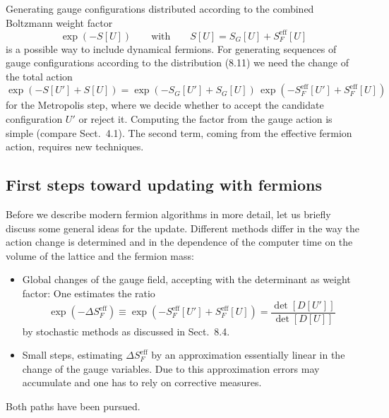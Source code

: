 Generating gauge configurations distributed according to the combined
Boltzmann weight factor
\begin{equation}
\exp(-S[U]) \qquad \text{with} \qquad S[U] = S_G[U] + S_F^{\mathrm{eff}}[U]
\end{equation}
is a possible way to include dynamical fermions. For generating sequences of
gauge configurations according to the distribution (8.11) we need the change of
the total action
\begin{equation}
\exp(-S[U'] + S[U]) = \exp(-S_G[U'] + S_G[U])\,
  \exp(-S_F^{\mathrm{eff}}[U'] + S_F^{\mathrm{eff}}[U])
\end{equation}
for the Metropolis step, where we decide whether to accept the candidate
configuration $U'$ or reject it. Computing the factor from the gauge action is
simple (compare Sect.~4.1). The second term, coming from the effective fermion
action, requires new techniques.

\subsection{First steps toward updating with fermions}

Before we describe modern fermion algorithms in more detail, let us briefly
discuss some general ideas for the update. Different methods differ in the way
the action change is determined and in the dependence of the computer time on
the volume of the lattice and the fermion mass:
\begin{itemize}
  \item Global changes of the gauge field, accepting with the determinant as
        weight factor: One estimates the ratio
        \begin{equation}
        \exp(-\Delta S_F^{\mathrm{eff}})
        \equiv \exp(-S_F^{\mathrm{eff}}[U'] + S_F^{\mathrm{eff}}[U])
        = \frac{\det[D[U']]}{\det[D[U]]}
        \end{equation}
        by stochastic methods as discussed in Sect.~8.4.
  \item Small steps, estimating $\Delta S_F^{\mathrm{eff}}$ by an approximation
        essentially linear in the change of the gauge variables. Due to this
        approximation errors may accumulate and one has to rely on corrective
        measures.
\end{itemize}

Both paths have been pursued.

